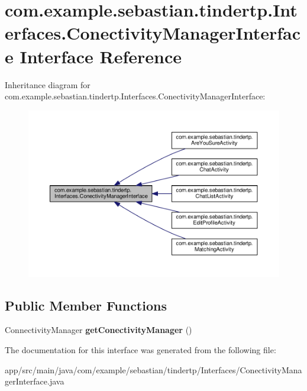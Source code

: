 \hypertarget{interfacecom_1_1example_1_1sebastian_1_1tindertp_1_1Interfaces_1_1ConectivityManagerInterface}{}\section{com.\+example.\+sebastian.\+tindertp.\+Interfaces.\+Conectivity\+Manager\+Interface Interface Reference}
\label{interfacecom_1_1example_1_1sebastian_1_1tindertp_1_1Interfaces_1_1ConectivityManagerInterface}


Inheritance diagram for com.\+example.\+sebastian.\+tindertp.\+Interfaces.\+Conectivity\+Manager\+Interface\+:
\nopagebreak
\begin{figure}[H]
\begin{center}
\leavevmode
\includegraphics[width=350pt]{interfacecom_1_1example_1_1sebastian_1_1tindertp_1_1Interfaces_1_1ConectivityManagerInterface__inherit__graph}
\end{center}
\end{figure}
\subsection*{Public Member Functions}
\begin{DoxyCompactItemize}
\item 
Connectivity\+Manager {\bfseries get\+Conectivity\+Manager} ()\hypertarget{interfacecom_1_1example_1_1sebastian_1_1tindertp_1_1Interfaces_1_1ConectivityManagerInterface_ae3f301bef962e13c1076dccf965db06c}{}\label{interfacecom_1_1example_1_1sebastian_1_1tindertp_1_1Interfaces_1_1ConectivityManagerInterface_ae3f301bef962e13c1076dccf965db06c}

\end{DoxyCompactItemize}


The documentation for this interface was generated from the following file\+:\begin{DoxyCompactItemize}
\item 
app/src/main/java/com/example/sebastian/tindertp/\+Interfaces/Conectivity\+Manager\+Interface.\+java\end{DoxyCompactItemize}
